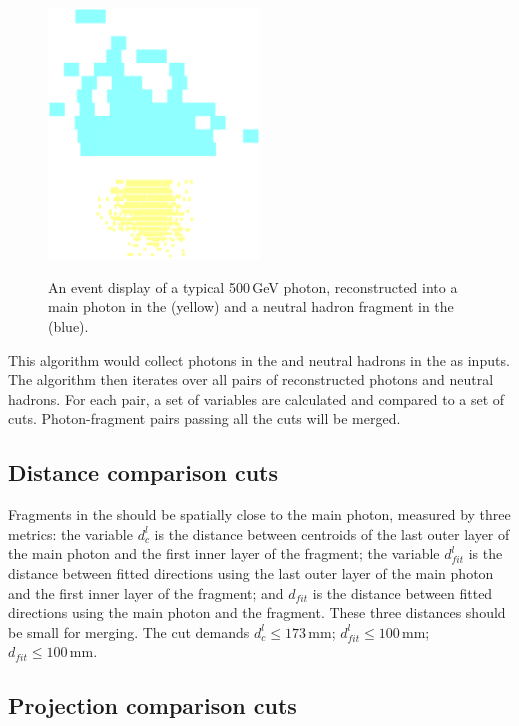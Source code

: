 \begin{figure}[tbph]
\centering
{\includegraphics[width=0.5\textwidth]{photon/hcalfrag}}%
\caption{An event display of a typical 500\,GeV photon, reconstructed into a main photon in the \ECAL (yellow) and a neutral hadron fragment in the \HCAL (blue).}
\label{fig:photonEvtDspHCalFrag}
\end{figure}

This algorithm would collect photons in the \ECAL and neutral hadrons in the \HCAL as inputs. The algorithm then iterates over all pairs of reconstructed photons and neutral hadrons. For each pair, a set of variables are calculated and compared to a set of cuts. Photon-fragment pairs passing all the cuts will be merged.

\subsection{Distance comparison cuts}

Fragments in the \HCAL should be spatially close to the main photon, measured by three metrics: the variable $d^l_c$ is the distance between centroids of the last outer layer of the main photon and the first inner layer of the fragment; the variable $d^l_{fit}$ is the distance between fitted directions using the last outer layer of the main photon and the first inner layer of the fragment; and $d_{fit}$ is the distance between fitted directions using the main photon and the fragment. These three distances should be small for merging. The cut demands $d^l_c \leqslant 173\,\text{mm}$; $d^l_{fit} \leqslant 100\,\text{mm}$; $d_{fit} \leqslant 100\,\text{mm}$.

\subsection{Projection comparison cuts}

